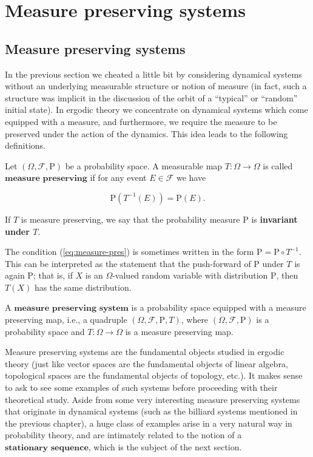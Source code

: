 

\chapter{Measure preserving systems}

\section{Measure preserving systems}
In the previous section we cheated a little bit by
considering dynamical systems without an underlying
measurable structure or notion of measure (in fact,
such a structure was implicit in the discussion of the
orbit of a ``typical'' or ``random'' initial state).
In ergodic theory we concentrate on dynamical systems
which come equipped with a measure, and furthermore,
we require the measure to be preserved under the
action of the dynamics. This idea leads to the
following definitions.

\begin{defn}
Let $(\Omega, \mathcal{F}, \mathrm{P})$ be a
probability space. A measurable map
$T:\Omega\to\Omega$ is called
$\textbf{measure preserving}$ if for any event
$E\in\mathcal{F}$ we have

\begin{equation*} \tag{13}\label{eq:measure-pres}
\mathrm{P}(T^{-1}(E)) = \mathrm{P}(E).
\end{equation*}

\noindent If $T$ is measure preserving, we say that the
probability measure $\mathrm{P}$ is \textbf{invariant under
$T$}.
\end{defn}

\noindent The condition (\ref{eq:measure-pres}) is sometimes
written in the form
$\mathrm{P}=\mathrm{P}\circ T^{-1}$. This can be
interpreted as the statement that the push-forward of
$\mathrm{P}$ under $T$ is again $\mathrm{P}$; that
is, if $X$ is an $\Omega$-valued random variable with
distribution $\mathrm{P}$, then $T(X)$ has the same
distribution.

\begin{defn}
A $\textbf{measure preserving system}$ is a
probability space equipped with a measure preserving
map, i.e., a quadruple
$(\Omega, \mathcal{F}, \mathrm{P}, T)$, where
$(\Omega,\mathcal{F},\mathrm{P})$ is a probability
space and $T:\Omega\to\Omega$ is a measure preserving
map.
\end{defn}

\noindent Measure preserving systems are the fundamental
objects studied in ergodic theory (just like vector
spaces are the fundamental objects of linear algebra,
topological spaces are the fundamental objects of
topology, etc.). It makes sense to ask to see some
examples of such systems before proceeding with their
theoretical study. Aside from some very interesting
measure preserving systems that originate in dynamical
systems (such as the billiard systems mentioned in the
previous chapter), a huge class of examples arise in a
very natural way in probability theory, and are
intimately related to the notion of a
$\textbf{stationary sequence}$, which is the subject
of the next section.

